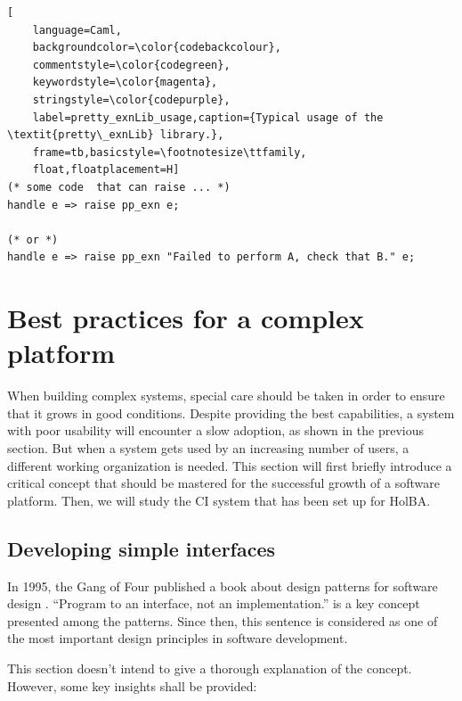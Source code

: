 \documentclass{kththesis}
\begin{document}
{\begin{lstlisting}[
    language=Caml,
    backgroundcolor=\color{codebackcolour},
    commentstyle=\color{codegreen},
    keywordstyle=\color{magenta},
    stringstyle=\color{codepurple},
    label=pretty_exnLib_usage,caption={Typical usage of the \textit{pretty\_exnLib} library.},
    frame=tb,basicstyle=\footnotesize\ttfamily,
    float,floatplacement=H]
(* some code  that can raise ... *)
handle e => raise pp_exn e;

(* or *)
handle e => raise pp_exn "Failed to perform A, check that B." e;
\end{lstlisting}


\section{Best practices for a complex platform} \label{best-practices-complex-platform}

When building complex systems, special care should be taken in order to ensure that it grows in good conditions. Despite providing the best capabilities, a system with poor usability will encounter a slow adoption, as shown in the previous section. But when a system gets used by an increasing number of users, a different working organization is needed. This section will first briefly introduce a critical concept that should be mastered for the successful growth of a software platform. Then, we will study the \gls{CI} system that has been set up for HolBA.

\subsection{Developing simple interfaces}


In 1995, the Gang of Four published a book about design patterns for software design \cite{gamma_design_1995}. ``Program to an interface, not an implementation.'' is a key concept presented among the patterns. Since then, this sentence is considered as one of the most important design principles in software development.

This section doesn't intend to give a thorough explanation of the concept. However, some key insights shall be provided:

}
\end{document}
